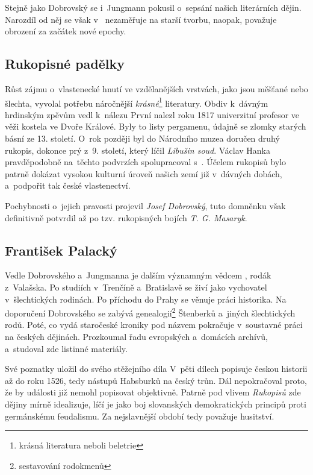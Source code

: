 Stejně jako Dobrovský se i~Jungmann pokusil o~sepsání našich literárních
dějin. Narozdíl od něj se však v~
nezaměřuje na starší tvorbu, naopak, považuje obrození za začátek nové
epochy.

\subsection*{Rukopisné padělky
}
Růst zájmu o~vlastenecké hnutí ve vzdělanějších vrstvách, jako jsou
měšťané nebo šlechta, vyvolal potřebu náročnější
\emph{krásné}\footnote{krásná literatura neboli beletrie} literatury.
Obdiv k~dávným hrdinským zpěvům vedl k~nálezu  První nalezl roku 1817 univerzitní
profesor  ve věži kostela ve Dvoře Králové. Byly to
listy pergamenu, údajně se zlomky starých básní ze 13. století. O~rok
později byl do Národního muzea doručen druhý rukopis, dokonce prý z~9.
století, který líčil \emph{Libušin soud}. Václav Hanka pravděpodobně
na~těchto podvrzích spolupracoval s~.
Účelem rukopisů bylo patrně dokázat vysokou kulturní úroveň našich zemí
již v~dávných dobách, a~podpořit tak české vlastenectví.

Pochybnosti o~jejich pravosti projevil \emph{Josef Dobrovský}, tuto domněnku
však definitivně potvrdil až po tzv. rukopisných bojích \emph{T. G. Masaryk}.

\subsection*{František Palacký}
Vedle Dobrovského a~Jungmanna je dalším významným vědcem
, rodák z~Valašska. Po studiích v~Trenčíně
a~Bratislavě se živí jako vychovatel v~šlechtických rodinách. Po
příchodu do Prahy se věnuje práci historika. Na doporučení Dobrovského
se zabývá genealogií\footnote{sestavování rodokmenů} Štenberků a~jiných
šlechtických rodů. Poté, co vydá staročeské kroniky pod názvem
 pokračuje v~soustavné práci na českých
dějinách. Prozkoumal řadu evropských a~domácích archívů, a~studoval zde
listinné materiály.

Své poznatky uložil do svého stěžejního díla 
 V~pěti dílech
popisuje českou historii až do roku 1526, tedy nástupů Habsburků na
český trůn. Dál nepokračoval proto, že by události již nemohl popisovat
objektivně. Patrně pod vlivem \emph{Rukopisů} zde dějiny mírně
idealizuje, líčí je jako boj slovanských demokratických principů proti
germánskému feudalismu. Za nejslavnější období tedy považuje husitství.

